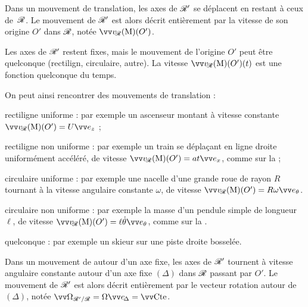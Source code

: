 \documentclass[12pt,fancy]{cours}
\begin{document}
\begin{definition}[Translation]\label{def:}
  Dans un mouvement de translation, les axes de $\mathcal{R}'$ se déplacent en restant  à ceux de~$\mathcal{R}$. Le mouvement de $\mathcal{R}'$ est alors décrit entièrement par la vitesse de son origine $O'$ dans $\mathcal{R}$, notée $\vR(O')$.
\end{definition}
\begin{danger}
  Les axes de $\mathcal{R}'$ restent fixes, mais le mouvement de l'origine $O'$ peut être quelconque (rectilign, circulaire, autre). La vitesse $\vR(O')(t)$ est une fonction quelconque du temps.
\end{danger}
On peut ainsi rencontrer des mouvements de translation :
\begin{liste}
  \item rectiligne uniforme : par exemple un ascenseur montant à vitesse constante $\vR(O') = U\ez$ ;
  \item rectiligne non uniforme : par exemple un train se déplaçant en ligne droite uniformément accéléré, de vitesse $\vR(O') = a t \ex$, comme sur la  ;
  \item circulaire uniforme : par exemple une nacelle d'une grande roue de rayon $R$ tournant à la vitesse angulaire constante $\omega$, de vitesse $\vR(O') = R \omega \et$.
  \item circulaire non uniforme : par exemple la masse d'un pendule simple de longueur $\ell$, de vitesse $\vR(O') = \ell \dot{\theta} \et$, comme sur la .
  \item quelconque : par exemple un skieur sur une piste droite bosselée.
\end{liste}


%
\begin{definition}\label{def:}
  Dans un mouvement de  autour d'un axe fixe, les axes de $\mathcal{R}'$ tournent à vitesse angulaire constante autour d'un axe fixe $(\Delta)$ dans $\mathcal{R}$ passant par $O'$. Le mouvement de $\mathcal{R}'$ est alors décrit entièrement par le vecteur rotation autour de $(\Delta)$, notée $\OR = \Omega \Vec{e}_{\!\Delta} = \Vec{\cte}$.
\end{definition}
\end{document}
